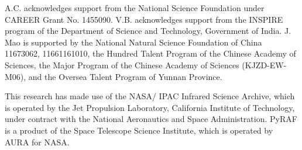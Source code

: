 \documentclass[twocolumn]{aastex6}
\begin{document}
A.C. acknowledges support from the National Science Foundation under CAREER Grant No. 1455090. V.B. acknowledges support from the INSPIRE program of the Department of Science and Technology, Government of India.	J. Mao is supported by the National Natural Science Foundation of China 11673062, 11661161010, the Hundred Talent Program of the Chinese Academy of Sciences, the Major Program of the Chinese Academy of Sciences (KJZD-EW-M06), and the Oversea Talent Program of Yunnan Province.

This research has made use of the NASA/ IPAC Infrared Science Archive, which is operated by the Jet Propulsion Laboratory, California Institute of Technology, under contract with the National Aeronautics and Space Administration. PyRAF is a product of the Space Telescope Science Institute, which is operated by AURA for NASA.




\end{document}
